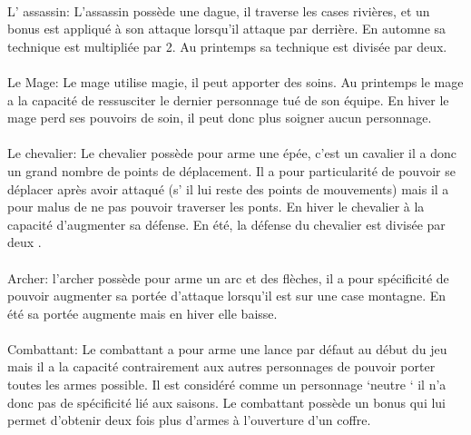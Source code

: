 \documentclass[a4paper,12pt]{article}
\begin{document}
\paragraph{}
L' assassin: L'assassin possède une dague, il traverse les cases rivières, et un bonus est appliqué à son attaque lorsqu'il attaque par derrière. En automne sa technique est multipliée par 2. Au printemps sa technique est divisée par deux.
\paragraph{}
Le Mage: Le mage utilise magie, il peut apporter des soins. 
Au printemps le mage a la capacité de ressusciter le dernier personnage tué de son équipe. En hiver le mage perd ses pouvoirs de soin, il peut donc plus soigner aucun personnage. 
\paragraph{}
Le chevalier: Le chevalier possède pour arme une épée, c'est un cavalier il a donc un grand nombre de points de déplacement. Il a pour particularité de pouvoir se déplacer après avoir attaqué (s' il lui reste des points de mouvements) mais il a pour malus de ne pas pouvoir traverser les ponts. En hiver le chevalier à la capacité d’augmenter sa défense. En été, la défense du chevalier est divisée par deux . 
\paragraph{}
Archer: l’archer possède pour arme un arc et des flèches, il a pour spécificité de pouvoir augmenter sa portée d'attaque lorsqu'il est sur une case montagne. 
En été sa portée augmente mais en hiver elle baisse.  
\paragraph{}
Combattant: Le combattant  a pour arme une lance par défaut au début du jeu mais il a la capacité contrairement aux autres personnages de pouvoir porter toutes les armes possible.  Il est considéré comme un personnage ‘neutre ‘ il n’a donc pas de spécificité lié aux saisons.
Le combattant possède un bonus qui lui permet d’obtenir deux fois plus d’armes à l’ouverture d’un coffre.
\end{document}
